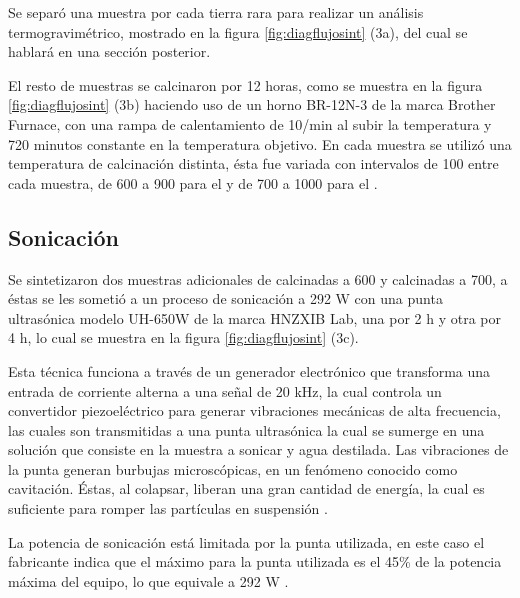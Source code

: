 \documentclass[../main.tex]{subfiles}
\begin{document}
    Se separó una muestra por cada tierra rara para realizar un análisis termogravimétrico, mostrado en la figura \ref{fig:diagflujosint} (3a), del cual se hablará en una sección posterior.

    El resto de muestras se calcinaron por 12 horas, como se muestra en la figura \ref{fig:diagflujosint} (3b) haciendo uso de un horno BR-12N-3 de la marca Brother Furnace, con una rampa de calentamiento de 10\gradoC{}/min al subir la temperatura y 720 minutos constante en la temperatura objetivo. En cada muestra se utilizó una temperatura de calcinación distinta, ésta fue variada con intervalos de 100\gradoC{} entre cada muestra, de 600 a 900\gradoC{} para el \neod{} y de 700 a 1000\gradoC{} para el \sama{}.
\subsection{Sonicación}
    Se sintetizaron dos muestras adicionales de \neod{} calcinadas a 600\gradoC{} y \sama{} calcinadas a 700\gradoC{}, a éstas se les sometió a un proceso de sonicación a 292 W con una punta ultrasónica modelo UH-650W de la marca HNZXIB Lab, una por 2 h y otra por 4 h, lo cual se muestra en la figura \ref{fig:diagflujosint} (3c).

    Esta técnica funciona a través de un generador electrónico que transforma una entrada de corriente alterna a una señal de 20 kHz, la cual controla un convertidor piezoeléctrico para generar vibraciones mecánicas de alta frecuencia, las cuales son transmitidas a una punta ultrasónica la cual se sumerge en una solución que consiste en la muestra a sonicar y agua destilada. Las vibraciones de la punta generan burbujas microscópicas, en un fenómeno conocido como cavitación. Éstas, al colapsar, liberan una gran cantidad de energía, la cual es suficiente para romper las partículas en suspensión \cite{sonicaciondef}.

    La potencia de sonicación está limitada por la punta utilizada, en este caso el fabricante indica que el máximo para la punta utilizada es el 45\% de la potencia máxima del equipo, lo que equivale a 292 W \cite{manualpunta}.
\end{document}
